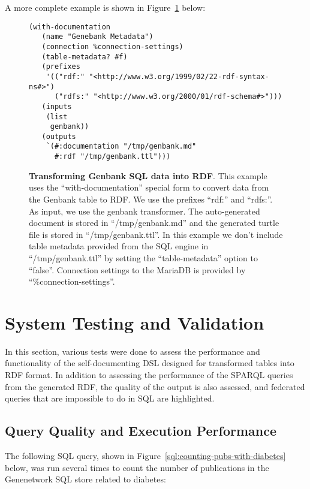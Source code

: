 A more complete example is shown in Figure~\ref{code:with-documentation-example} below:

\begin{figure}[H]
\centering
\begin{verbatim}
(with-documentation
   (name "Genebank Metadata")
   (connection %connection-settings)
   (table-metadata? #f)
   (prefixes
    '(("rdf:" "<http://www.w3.org/1999/02/22-rdf-syntax-ns#>")
      ("rdfs:" "<http://www.w3.org/2000/01/rdf-schema#>")))
   (inputs
    (list
     genbank))
   (outputs
    `(#:documentation "/tmp/genbank.md"
      #:rdf "/tmp/genbank.ttl")))
\end{verbatim}
\caption[Transforming Genbank SQL data into RDF using \textit{``with-documentation''} special form]{\textbf{Transforming Genbank SQL data into RDF}.  This example uses the ``with-documentation'' special form to convert data from the Genbank table to RDF.  We use the prefixes ``rdf:'' and ``rdfs:''.  As input, we use the genbank transformer.  The auto-generated document is stored in ``/tmp/genbank.md'' and the generated turtle file is stored in ``/tmp/genbank.ttl''.  In this example we don't include table metadata provided from the SQL engine in ``/tmp/genbank.ttl'' by setting the ``table-metadata'' option to ``false''.  Connection settings to the MariaDB is provided by ``\%connection-settings''.}\label{code:with-documentation-example}
\end{figure}

\section{System Testing and Validation}

In this section, various tests were done to assess the performance and functionality of the self-documenting DSL designed for transformed tables into RDF format.  In addition to assessing the performance of the SPARQL queries from the generated RDF, the quality of the output is also assessed, and federated queries that are impossible to do in SQL are highlighted.

\subsection{Query Quality and Execution Performance}
\label{sec:benchmark}

The following SQL query, shown in Figure~\ref{sql:counting-pubs-with-diabetes} below, was run several times to count the number of publications in the Genenetwork SQL store related to diabetes:

